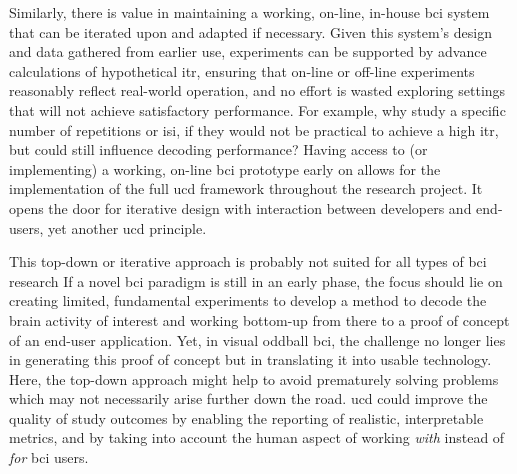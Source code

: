 Similarly, there is value in maintaining a working, on-line, in-house \ac{bci}
system that can be iterated upon and adapted if necessary.
Given this system's design and data gathered from earlier use, experiments can
be supported by advance calculations of hypothetical
\ac{itr}, ensuring that on-line or off-line experiments reasonably reflect
real-world operation, and no effort is wasted exploring settings that will not
achieve satisfactory performance.
For example, why study a specific number of repetitions or \ac{isi}, if they
would not be practical to achieve a high \ac{itr}, but could still influence
decoding performance?
Having access to (or implementing) a working, on-line \ac{bci} prototype early
on allows for the implementation of the full \ac{ucd} framework throughout the research
project.
It opens the door for iterative design with interaction between developers and
end-users, yet another \ac{ucd} principle.

This top-down or iterative approach is probably not suited for all types of \ac{bci}
research
If a novel \ac{bci} paradigm is still in an early phase, the focus
should lie on creating limited, fundamental experiments to develop a method to
decode the brain activity of interest and working bottom-up from there to a
proof of concept of an end-user application.
Yet, in visual oddball \ac{bci}, the challenge no longer lies in generating
this proof of concept but in translating it into usable technology.
Here, the top-down approach might help to avoid prematurely solving problems
which may not necessarily arise further down the road.
\Ac{ucd} could improve the quality of study outcomes by enabling the
reporting of realistic, interpretable metrics, and by taking into account the
human aspect of working \emph{with} instead of \emph{for} \ac{bci} users.
